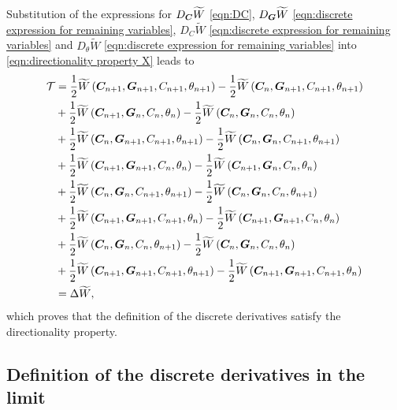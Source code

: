 Substitution of the expressions for $D_{\boldsymbol{C}}\widetilde{W}$  \eqref{eqn:DC}, $D_{\boldsymbol{G}}\widetilde{W}$ \eqref{eqn:discrete expression for remaining variables}, $D_{{C}}\widetilde{W}$ \eqref{eqn:discrete expression for remaining variables} and $D_{\theta}\widetilde{W}$ \eqref{eqn:discrete expression for remaining variables} into \eqref{eqn:directionality property X} leads to
%
\begin{equation}
\begin{aligned}
\mathcal{T} 
& =\frac{1}{2}{\widetilde{W}\left(\vect{C}_{n+1},\vect{G}_{n+1},C_{n+1},\theta_{{n+1}}\right) - \frac{1}{2}\widetilde{W}\left(\vect{C}_{n},\vect{G}_{n+1},C_{n+1},\theta_{{n+1}}\right)}\\
%
&+\frac{1}{2}{\widetilde{W}\left(\vect{C}_{n+1},\vect{G}_{n},C_{n},\theta_{{n}}\right) - \frac{1}{2}\widetilde{W}\left(\vect{C}_{n},\vect{G}_{n},C_{n},\theta_{{n}}\right)}\\
%
&+\frac{1}{2}{\widetilde{W}\left(\vect{C}_{n},\vect{G}_{n+1},C_{n+1},\theta_{{n+1}}\right) - \frac{1}{2}\widetilde{W}\left(\vect{C}_{n},\vect{G}_{n},C_{n+1},\theta_{{n+1}}\right)}\\
%
&+\frac{1}{2}{\widetilde{W}\left(\vect{C}_{n+1},\vect{G}_{n+1},C_{n},\theta_{{n}}\right) - \frac{1}{2}\widetilde{W}\left(\vect{C}_{n+1},\vect{G}_{n},C_{n},\theta_{{n}}\right)}\\
%
& +  \frac{1}{2}{\widetilde{W}\left(\vect{C}_{n},\vect{G}_{n},C_{n+1},\theta_{{n+1}}\right) - \frac{1}{2}\widetilde{W}\left(\vect{C}_{n},\vect{G}_{n},C_{n},\theta_{{n+1}}\right)}\\
%
&+\frac{1}{2}{\widetilde{W}\left(\vect{C}_{n+1},\vect{G}_{n+1},C_{n+1},\theta_{{n}}\right) - \frac{1}{2}\widetilde{W}\left(\vect{C}_{n+1},\vect{G}_{n+1},C_{n},\theta_{{n}}\right)}\\
%
&+\frac{1}{2}{\widetilde{W}\left(\vect{C}_{n},\vect{G}_{n},C_{n},\theta_{{n+1}}\right) - \frac{1}{2}\widetilde{W}\left(\vect{C}_{n},\vect{G}_{n},C_{n},\theta_{{n}}\right)}\\
%
&+\frac{1}{2}{\widetilde{W}\left(\vect{C}_{n+1},\vect{G}_{n+1},C_{n+1},\theta_{{n+1}}\right) - \frac{1}{2}\widetilde{W}\left(\vect{C}_{n+1},\vect{G}_{n+1},C_{n+1},\theta_{{n}}\right)}\\
%
&=
\Delta \widetilde{W},
%
\end{aligned}
\end{equation}
%
which proves that the definition of the discrete derivatives satisfy the directionality property.

\subsection{Definition of the discrete derivatives in the limit}

